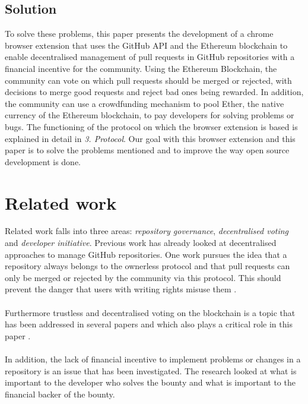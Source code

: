 \documentclass[sigconf]{acmart}
\begin{document}
\subsection{Solution}
To solve these problems, this paper presents the development of a chrome browser extension that uses the GitHub API and the 
Ethereum blockchain to enable decentralised management of pull requests in GitHub repositories with a financial incentive for 
the community. Using the Ethereum Blockchain, the community can vote on which pull requests should be merged or rejected,
 with decisions to merge good requests and reject bad ones being rewarded. In addition, the community can use a crowdfunding
 mechanism to pool Ether, the native currency of the Ethereum blockchain, to pay developers for solving problems or bugs. The
 functioning of the protocol on which the browser extension is based is explained in detail in \textit{3. Protocol}. Our goal with
 this browser extension and this paper is to solve the problems mentioned and to improve the way open source development 
is done.

\section{Related work}
Related work falls into three areas: \textit{repository governance}, \textit{decentralised voting} and \textit{developer initiative}. 
Previous work has already looked at decentralised approaches to manage GitHub repositories. One work pursues the idea that 
a repository always belongs to the ownerless protocol and that pull requests can only be merged or rejected by the community 
via this protocol. This should prevent the danger that users with writing rights misuse them \cite{ulrich2020dev}. \\ \\
Furthermore trustless and decentralised voting on the blockchain is a topic that has been addressed in several papers 
and which also plays a critical role in this paper \cite{khoury2018decentralized, ulrich2020dev}. \\ \\
In addition, the lack of financial incentive to implement problems or changes in a repository is an issue that has been investigated. 
The research looked at what is important to the developer who solves the bounty and what is important to the financial backer of 
the bounty. \cite{zhou2019bounties}
\end{document}
